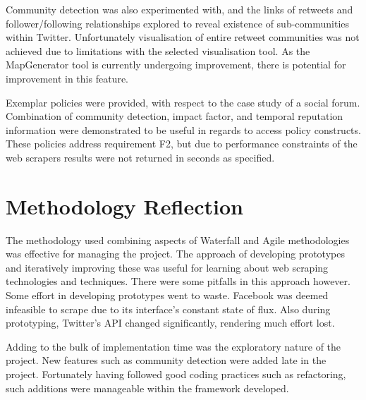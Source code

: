 Community detection was also experimented with, and the links of retweets and follower/following relationships explored to reveal existence of sub-communities within Twitter. Unfortunately visualisation of entire retweet communities was not achieved due to limitations with the selected visualisation tool. As the MapGenerator tool is currently undergoing improvement, there is potential for improvement in this feature.

Exemplar policies were provided, with respect to the case study of a social forum. Combination of community detection, impact factor, and temporal reputation information were demonstrated to be useful in regards to access policy constructs. These policies address requirement F2, but due to performance constraints of the web scrapers results were not returned in seconds as specified.

\section{Methodology Reflection}

The methodology used combining aspects of Waterfall and Agile methodologies was effective for managing the project. The approach of developing prototypes and iteratively improving these was useful for learning about web scraping technologies and techniques. There were some pitfalls in this approach however. Some effort in developing prototypes went to waste. Facebook was deemed infeasible to scrape due to its interface's constant state of flux. Also during prototyping, Twitter's API changed significantly, rendering much effort lost. 

Adding to the bulk of implementation time was the exploratory nature of the project. New features such as community detection were added late in the project. Fortunately having followed good coding practices such as refactoring, such additions were manageable within the framework developed.  

 

